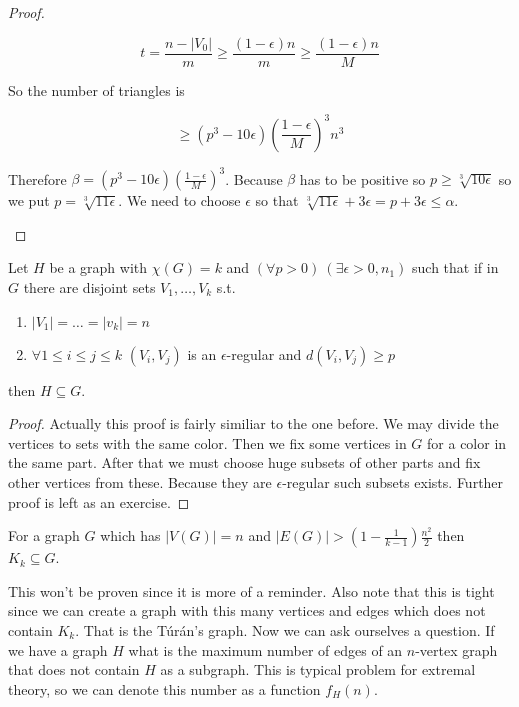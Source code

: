 \begin{proof}
\begin{enumerate}[(a)]
		$$
		t = \frac{n - |V_0|}{m} \geq \frac{(1-\epsilon)n}{m} \geq \frac{(1 - \epsilon)n}{M}
		$$
		
		So the number of triangles is
		
		$$
		\geq (p^3 - 10\epsilon) \left( \frac{1-\epsilon}{M} \right)^3 n^3
		$$
		
		Therefore $\beta = (p^3 - 10\epsilon) \left( \frac{1-\epsilon}{M} \right)^3$. Because $\beta$ has to be positive so $p \geq \sqrt[3]{10 \epsilon}$ so we put $p = \sqrt[3]{11\epsilon}$. We need to choose $\epsilon$ so that $\sqrt[3]{11\epsilon} + 3\epsilon = p + 3\epsilon \leq \alpha$.
	\end{enumerate}
\end{proof}

\begin{lemma}
	Let $H$ be a graph with $\chi(G) = k$ and $(\forall p > 0) \ (\exists \epsilon > 0, n_1)$ such that if in $G$ there are disjoint sets $V_1, \dots, V_k$ s.t.
	
	\begin{enumerate}
		\item $|V_1| = \dots = |v_{k}| = n$
		\item $\forall 1 \leq i \leq j \leq k$ $(V_i, V_j)$ is an $\epsilon$-regular and $d(V_i, V_j) \geq p$
	\end{enumerate}
	
	then $H \subseteq G$.
\end{lemma}

\begin{proof}
	Actually this proof is fairly similiar to the one before. We may divide the vertices to sets with the same color. Then we fix some vertices in $G$ for a color in the same part. After that we must choose huge subsets of other parts and fix other vertices from these. Because they are $\epsilon$-regular such subsets exists. Further proof is left as an exercise.
\end{proof}

\begin{thm}[Túrán]
	For a graph $G$ which has $|V(G)| = n$ and $|E(G)| > \left(1 - \frac{1}{k-1}\right) \frac{n^2}{2}$ then $K_k \subseteq G$.
\end{thm}

This won't be proven since it is more of a reminder. Also note that this is tight since we can create a graph with this many vertices and edges which does not contain $K_k$. That is the Túrán's graph. Now we can ask ourselves a question. If we have a graph $H$ what is the maximum number of edges of an $n$-vertex graph that does not contain $H$ as a subgraph. This is typical problem for extremal theory, so we can denote this number as a function $f_H(n)$.

